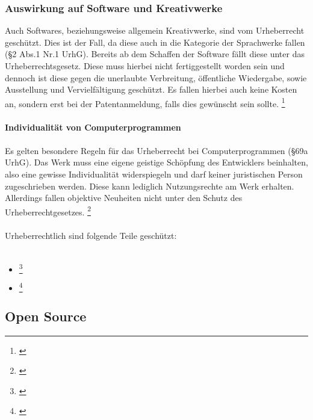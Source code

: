 \documentclass[titlepage,12pt,twoside]{article}
\begin{document}
\subsubsection{Auswirkung auf Software und Kreativwerke}
\hfill \break
\hfill \break
Auch Softwares, beziehungsweise allgemein Kreativwerke, sind vom Urheberrecht geschützt. Dies ist der Fall, 
da diese auch in die Kategorie der Sprachwerke fallen (§2 Abs.1 Nr.1 UrhG). Bereits ab dem Schaffen der 
Software fällt diese unter das Urheberrechtsgesetz. Diese muss hierbei nicht fertiggestellt worden sein und 
dennoch ist diese gegen die unerlaubte Verbreitung, öffentliche Wiedergabe, sowie Ausstellung und 
Vervielfältigung geschützt. Es fallen hierbei auch keine Kosten an, sondern erst bei der Patentanmeldung, 
falls dies gewünscht sein sollte. \footnote{\cite{Ionos7}} \\
\\
\textbf{Individualität von Computerprogrammen} \\
\\
Es gelten besondere Regeln für das Urheberrecht bei Computerprogrammen (§69a UrhG). Das Werk muss eine eigene 
geistige Schöpfung des Entwicklers beinhalten, also eine gewisse Individualität widerspiegeln und darf keiner 
juristischen Person zugeschrieben werden. Diese kann lediglich Nutzungsrechte am Werk erhalten. Allerdings 
fallen objektive Neuheiten nicht unter den Schutz des Urheberrechtgesetzes. \footnote{\cite{Ionos8}} \\
\\
Urheberrechtlich sind folgende Teile geschützt: \\
\\
\begin{itemize}
	\item {} \footnote{\cite{Ionos9}}
	\item {} \footnote{\cite{Ionos10}}
\end{itemize}
\hfill \break

\subsection{Open Source}
\end{document}
